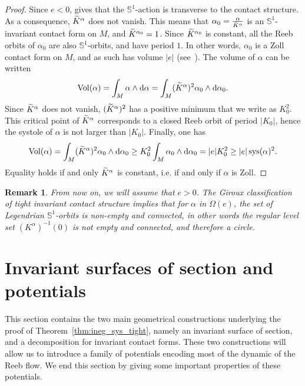 \documentclass[10pt,a4paper]{amsart}
\DeclareMathOperator{\vol}{Vol}
\DeclareMathOperator{\sys}{sys}
\newcommand{\bbS}{\mathbb{S}}
\newcommand{\rmd}{\mathrm{d}}
\let\oldtilde\tilde
\renewcommand*{\tilde}[1]{\mathchoice{\widetilde{#1}}{\widetilde{#1}}{\oldtilde{#1}}{\oldtilde{#1}}}
\newtheorem{rema}[theo]{Remark}
\theoremstyle{definition}\newtheorem{defi}[theo]{Definition}
\begin{document}
\begin{proof}
Since $e<0$, \cite[Theorem~1.1]{Giroux1999StructuresDC} gives that the $\bbS^1$-action is transverse to the contact structure. As a consequence, $\tilde K^\alpha$ does not vanish. This means that $\alpha_0 = \frac{\alpha}{\tilde K^\alpha}$ is an $\bbS^1$-invariant contact form on $M$, and $\tilde K^{\alpha_0} = 1$. Since $\tilde K^{\alpha_0}$ is constant, all the Reeb orbits of $\alpha_0$ are also $\bbS^1$-orbits, and have period $1$. In other words, $\alpha_0$ is a Zoll contact form on $M$, and as such has volume $|e|$ (see~\cite[Proposition~3.3]{paiva_2014_contact}). The volume of $\alpha$ can be written
\[
\vol(\alpha) = \int_{M} \alpha \wedge \rmd \alpha = \int_{M} (\tilde K^\alpha)^2 \alpha_0 \wedge \rmd \alpha_0.
\]
Since $\tilde K^\alpha$ does not vanish, $(\tilde K^\alpha)^2$ has a positive minimum that we write as $K_0^2$. This critical point of $\tilde K^\alpha$ corresponds to a closed Reeb orbit of period $|K_0|$, hence the systole of $\alpha$ is not larger than $|K_0|$. Finally, one has
\[
\vol(\alpha) = \int_{M} (\tilde K^\alpha)^2 \alpha_0 \wedge \rmd \alpha_0 \geq K_0^2 \int_{M} \alpha_0 \wedge \rmd \alpha_0 = |e|K_0^2 \geq |e|\sys(\alpha)^2.
\]
Equality holds if and only $\tilde K^\alpha$ is constant, i.e. if and only if $\alpha$ is Zoll.
\end{proof}

\begin{rema}\label{remark:tight_K_connected}
From now on, we will assume that $e>0$. The Giroux classification of tight invariant contact structure implies that for $\alpha$ in $\Omega(e)$, the set of Legendrian $\bbS^1$-orbits is non-empty and connected, in other words the regular level set $(K^\alpha)^{-1}(0)$ is not empty and connected, and therefore a circle.
\end{rema}

\section{Invariant surfaces of section and potentials}\label{sec:inv_surface_of_section_and_potentials}

This section contains the two main geometrical constructions underlying the proof of Theorem~\ref{thm:ineg_sys_tight}, namely an invariant surface of section, and a decomposition for invariant contact forms. These two constructions will allow us to introduce a family of potentials encoding most of the dynamic of the Reeb flow. We end this section by giving some important properties of these potentials.
\end{document}
